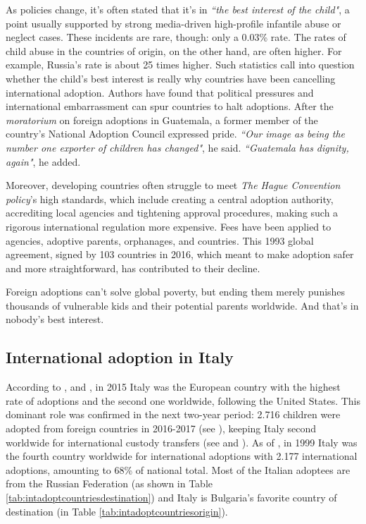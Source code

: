As policies change, it's often stated that it's in \textit{``the best interest of the child"}, a point usually supported by strong media-driven high-profile infantile abuse or neglect cases. These incidents are rare, though: only a 0.03\% rate. The rates of child abuse in the countries of origin, on the other hand, are often higher. For example, Russia's rate is about 25 times higher. Such statistics call into question whether the child's best interest is really why countries have been cancelling international adoption. Authors have found that political pressures and international embarrassment can spur countries to halt adoptions. After the \textit{moratorium} on foreign adoptions in Guatemala, a former member of the country's National Adoption Council expressed pride. \textit{``Our image as being the number one exporter of children has changed"}, he said. \textit{``Guatemala has dignity, again"}, he added.

Moreover, developing countries often struggle to meet \textit{The Hague Convention policy}'s high standards, which include creating a central adoption authority, accrediting local agencies and tightening approval procedures, making such a rigorous international regulation more expensive. Fees have been applied to agencies, adoptive parents, orphanages, and countries. This 1993 global agreement, signed by 103 countries in 2016, which meant to make adoption safer and more straightforward, has contributed to their decline.

Foreign adoptions can't solve global poverty, but ending them merely punishes thousands of vulnerable kids and their potential parents worldwide. And that's in nobody's best interest.

\subsection{International adoption in Italy}\label{sub:intadoptioninitaly}
According to \cite{notonlyinfectious}, \cite{nonsoloinfezioni} and \cite{cai2014}, in 2015 Italy was the European country with the highest rate of adoptions and the second one worldwide, following the United States. This dominant role was confirmed in the next two-year period: 2.716 children were adopted from foreign countries in 2016-2017 (see \cite{cai2016}), keeping Italy second worldwide for international custody transfers (see \cite{adoptdropping_article} and \cite{adoptdropping_book}).
As of \cite{unreport}, in 1999 Italy was the fourth country worldwide for international adoptions with 2.177 international adoptions, amounting to 68\% of national total. Most of the Italian adoptees are from the Russian Federation (as shown in Table \ref{tab:intadoptcountriesdestination}) and Italy is Bulgaria's favorite country of destination (in Table \ref{tab:intadoptcountriesorigin}).

